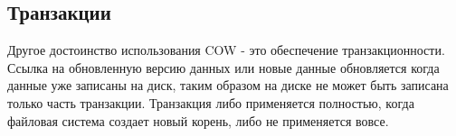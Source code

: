 \subsection{Транзакции}

Другое достоинство использования COW - это обеспечение транзакционности. Ссылка
на обновленную версию данных или новые данные обновляется когда данные уже
записаны на диск, таким образом на диске не может быть записана только часть
транзакции. Транзакция либо применяется полностью, когда файловая система
создает новый корень, либо не применяется вовсе.
